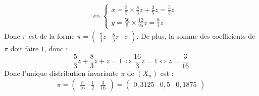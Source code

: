 \begin{tip}[Exemple]
\begin{align*}
			&\iff \begin{cases} x = \frac{2}{5} \times \frac{8}{3} z + \frac{3}{5}z = \frac{5}{3}z \\ y = \frac{50}{9} \times \frac{12}{25}z = \frac{8}{3}z \end{cases}
		\end{align*}
		Donc $\pi$ est de la forme $\pi = \begin{pmatrix} \frac{5}{3}z & \frac{8}{3}z & z \end{pmatrix}$. De plus, la somme des coefficients de $\pi$ doit faire $1$, donc :
		\[ \frac{5}{3}z + \frac{8}{3}z + z = 1 \iff \frac{16}{3}z = 1 \iff z = \frac{3}{16} \]
		Donc l'unique distribution invariante $\pi$ de $(X_n)$ est :
		\[ \pi = \begin{pmatrix} \frac{5}{16} & \frac{1}{2} & \frac{3}{16} \end{pmatrix} = \begin{pmatrix} 0,3125 & 0,5 & 0,1875 \end{pmatrix} \]
	\end{tip}

